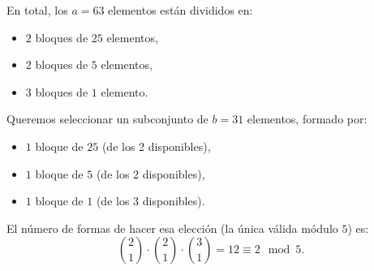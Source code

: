 \begin{itemize}
\begin{center}
\begin{tikzpicture}[scale=0.9]
    \end{tikzpicture}
    \end{center}
    \noindent En total, los $a=63$ elementos están divididos en:
    \begin{itemize}
        \item $2$ bloques de $25$ elementos,
        \item $2$ bloques de $5$ elementos,
        \item $3$ bloques de $1$ elemento.
    \end{itemize}
    
    Queremos seleccionar un subconjunto de $b=31$ elementos, formado por:
    \begin{itemize}
        \item $1$ bloque de $25$ (de los 2 disponibles),
        \item $1$ bloque de $5$ (de los 2 disponibles),
        \item $1$ bloque de $1$ (de los 3 disponibles).
    \end{itemize}
    \noindent El número de formas de hacer esa elección (la única válida módulo $5$) es:
    \[
    \binom{2}{1} \cdot \binom{2}{1} \cdot \binom{3}{1} = 12 \equiv 2 \mod 5.
    \]

    
    \end{itemize}
   